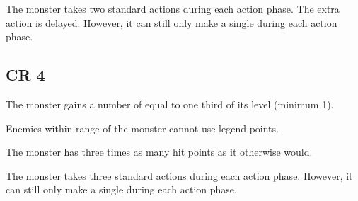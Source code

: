          The monster takes two standard actions during each action phase.
        The extra action is delayed.
        However, it can still only make a single  during each action phase.

    \subsection{CR 4}

         The monster gains a number of  equal to one third of its level (minimum 1).

         Enemies within \rnglong range of the monster cannot use legend points.

         The monster has three times as many hit points as it otherwise would.

         The monster takes three standard actions during each action phase.
        However, it can still only make a single  during each action phase.
